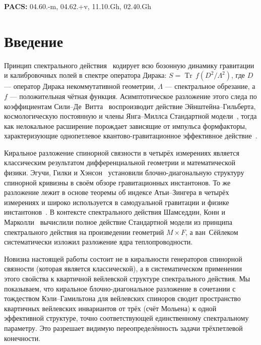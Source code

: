 \documentclass[12pt,a4paper]{article}
\theoremstyle{definition}
\theoremstyle{remark}
\newcommand{\Tr}{\operatorname{Tr}}
\newcommand{\Lam}{\Lambda}
\begin{document}
\noindent\textbf{PACS:} 04.60.-m, 04.62.+v, 11.10.Gh, 02.40.Gh

\tableofcontents
\newpage


\section{Введение}
\label{sec:intro}

Принцип спектрального действия~\cite{Chamseddine:1996zu,Chamseddine:2006ep}
кодирует всю бозонную динамику гравитации и калибровочных полей в спектре
оператора Дирака: $S = \Tr\, f(D^2/\Lam^2)$, где $D$ --- оператор Дирака
некоммутативной геометрии, $\Lam$ --- спектральное обрезание, а $f$ ---
положительная чётная функция.  Асимптотическое разложение этого следа по
коэффициентам Сили--Де~Витта~\cite{DeWitt:1964mxt,Gilkey:1975iq,%
Vassilevich:2003xt} воспроизводит действие Эйнштейна--Гильберта,
космологическую постоянную и члены Янга--Миллса Стандартной
модели~\cite{Chamseddine:2010ud,vanSuijlekom:2014pya}, тогда как нелокальное
расширение порождает зависящие от импульса формфакторы, характеризующие
однопетлевое квантово-гравитационное эффективное
действие~\cite{Barvinsky:1985an,Barvinsky:1987uw,Codello:2012kq}.

Киральное разложение спинорной связности в четырёх измерениях является
классическим результатом дифференциальной геометрии и математической физики.
Эгучи, Гилки и Хэнсон~\cite{EguchiGilkeyHanson:1980} установили
блочно-диагональную структуру спинорной кривизны в своём обзоре
гравитационных инстантонов.  То же разложение лежит в основе теоремы
об индексе Атьи--Зингера в четырёх измерениях и широко используется в
самодуальной гравитации и физике
инстантонов~\cite{AtiyahSinger:1968,AlvarezGaume:1983ig}.
В контексте спектрального действия Шамседдин, Конн и
Марколли~\cite{ChamseddineConnesMarcolli:2007} вычислили полное действие
Стандартной модели из принципа спектрального действия на произведении
геометрий $M \times F$, а ван~Сёйлеком~\cite{vanSuijlekom:2014pya}
систематически изложил разложение ядра теплопроводности.

Новизна настоящей работы состоит не в киральности генераторов спинорной
связности (которая является классической), а в систематическом применении
этого свойства к квартичной вейлевской структуре спектрального действия.
Мы показываем, что киральное блочно-диагональное разложение в сочетании с
тождеством Кэли--Гамильтона для вейлевских спиноров сводит пространство
квартичных вейлевских инвариантов от трёх (счёт Мольена) к одной
эффективной структуре, точно соответствующей единственному спектральному
параметру.  Это разрешает видимую переопределённость задачи трёхпетлевой
конечности.
\end{document}
